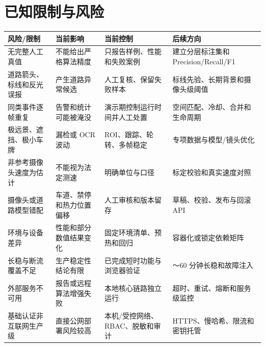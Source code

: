 \section{已知限制与风险}\label{design-ux5df2ux77e5ux9650ux5236ux4e0eux98ceux9669}

\begin{longtable}[]{@{}
  >{\raggedright\arraybackslash}p{}
  >{\raggedright\arraybackslash}p{}
  >{\raggedright\arraybackslash}p{}
  >{\raggedright\arraybackslash}p{}@{}}
\toprule\noalign{}
\begin{minipage}[b]{\linewidth}\raggedright
风险/限制
\end{minipage} & \begin{minipage}[b]{\linewidth}\raggedright
当前影响
\end{minipage} & \begin{minipage}[b]{\linewidth}\raggedright
当前控制
\end{minipage} & \begin{minipage}[b]{\linewidth}\raggedright
后续方向
\end{minipage} \\
\midrule\noalign{}
\endhead
\bottomrule\noalign{}
\endlastfoot
无完整人工真值 & 不能给出严格算法精度 & 只报告样例、性能和失败案例 & 建立分层标注集和 Precision/Recall/F1 \\
道路箭头、标线和反光误报 & 产生道路异常候选 & 人工复核、保留失败样本 & 标线先验、长期背景和摄像头级阈值 \\
同类事件逐帧重复 & 告警和统计可能被淹没 & 演示期控制运行时间并人工处置 & 空间匹配、冷却、合并和生命周期 \\
极远景、遮挡、极小车牌 & 漏检或 OCR 波动 & ROI、跟踪、轮转、多帧稳定 & 专项数据与模型/镜头优化 \\
非参考摄像头速度为估计 & 不能视为法定测速 & 明确单位与口径 & 标定校验和真实速度对照 \\
摄像头或道路模型错配 & 车道、禁停和热力位置偏移 & 人工审核和版本留存 & 草稿、校验、发布与回滚 API \\
环境与设备差异 & 性能和部分数值结果变化 & 固定环境清单、预热和回归 & 容器化或锁定依赖矩阵 \\
长稳与断流覆盖不足 & 生产稳定性结论有限 & 已完成短时功能与浏览器验证 & 30～60 分钟长稳和故障注入 \\
外部服务不可用 & 报告或远程算法增强失败 & 本地核心链路独立运行 & 超时、重试、熔断和服务级监控 \\
基础认证非互联网生产级 & 直接公网部署风险较高 & 本机/受控网络、RBAC、脱敏和审计 & HTTPS、慢哈希、限流和密钥托管 \\
\end{longtable}

